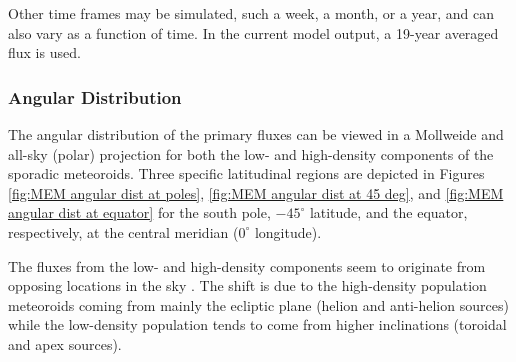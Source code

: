 \documentclass{article}
\begin{document}
Other time frames may be simulated, such a week, a month, or a year, and can also vary as a function of time. In the current model output, a 19-year averaged flux is used.


\subsubsection{Angular Distribution}

The angular distribution of the primary fluxes can be viewed in a Mollweide and all-sky (polar) projection for both the low- and high-density components of the sporadic meteoroids. Three specific latitudinal regions are depicted in Figures \ref{fig:MEM angular dist at poles}, \ref{fig:MEM angular dist at 45 deg}, and \ref{fig:MEM angular dist at equator} for the south pole, $-45^\circ$ latitude, and the equator, respectively, at the central meridian ($0^\circ$ longitude).

The fluxes from the low- and high-density components seem to originate from opposing locations in the sky \citep[e.g., see Figure 2.2 of][]{moorhead2019nasa}. The shift is due to the high-density population meteoroids coming from mainly the ecliptic plane (helion and anti-helion sources) while the low-density population tends to come from higher inclinations (toroidal and apex sources).
\end{document}
